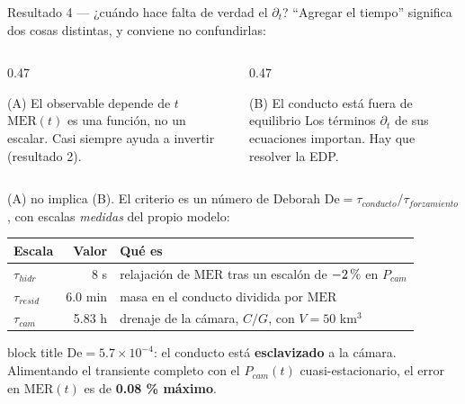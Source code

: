 \documentclass[aspectratio=169,10pt,t]{beamer}
\newcommand{\pc}{\ifmmode\text{\,\%}\else\,\%\fi}
\newcommand{\MER}{\mathrm{MER}}
\newcommand{\mensaje}[1]{%
  \vfill
  \begin{beamercolorbox}[wd=\linewidth,sep=0.4em,rounded=true]{block title}
  \footnotesize #1
  \end{beamercolorbox}}
\begin{document}
\begin{frame}{Resultado 4 — ¿cuándo hace falta de verdad el $\partial_t$?}
\small
``Agregar el tiempo'' significa dos cosas distintas, y conviene no confundirlas:
\smallskip
\begin{columns}[T]
\begin{column}{0.47\textwidth}
\begin{block}{(A) El observable depende de $t$}
$\MER(t)$ es una función, no un escalar. Casi siempre ayuda a invertir
(resultado 2).
\end{block}
\end{column}
\begin{column}{0.47\textwidth}
\begin{block}{(B) El conducto está fuera de equilibrio}
Los términos $\partial_t$ de sus ecuaciones importan. Hay que resolver la EDP.
\end{block}
\end{column}
\end{columns}
\smallskip
\alert{(A) no implica (B).} El criterio es un número de Deborah
$\mathrm{De}=\tau_{conducto}/\tau_{forzamiento}$, con escalas \emph{medidas} del
propio modelo:

\vspace{0.3em}
\centering\footnotesize
\begin{tabular}{@{}lrl@{}}
\toprule
\textbf{Escala} & \textbf{Valor} & \textbf{Qué es} \\
\midrule
$\tau_{hidr}$  & 8 s     & relajación de $\MER$ tras un escalón de $-2\pc$ en $P_{cam}$ \\
$\tau_{resid}$ & 6.0 min & masa en el conducto dividida por $\MER$ \\
$\tau_{cam}$   & 5.83 h  & drenaje de la cámara, $C/G$, con $V=50$ km$^3$ \\
\bottomrule
\end{tabular}

\mensaje{$\mathrm{De}=5.7\times10^{-4}$: el conducto está \textbf{esclavizado} a
la cámara. Alimentando el transiente completo con el $P_{cam}(t)$
cuasi-estacionario, el error en $\MER(t)$ es de \textbf{0.08 \% máximo}.}
\end{frame}
\end{document}
